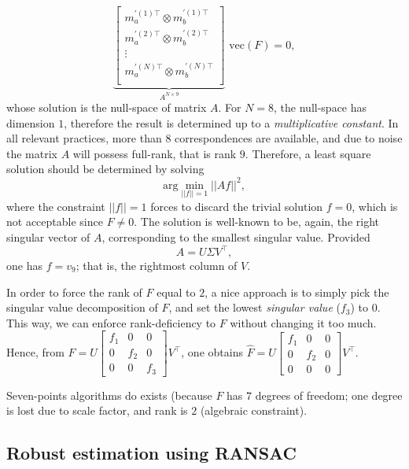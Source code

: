 \documentclass[10pt]{report}
\begin{document}
$$\underbrace{\begin{bmatrix} m^{\prime(1)\top}_a \otimes m^{\prime(1)\top}_b \\
m^{\prime(2)\top}_a \otimes m^{\prime(2)\top}_b \\
\vdots \\
m^{\prime(N)\top}_a \otimes m^{\prime(N)\top}_b \\ \end{bmatrix}}_{A^{N \times 9}}\mbox{ vec}(F) = 0,$$ whose solution is the null\--space of matrix \(A\). For \(N = 8\), the null\--space has dimension \(1\), therefore the result is determined up to a \emph{multiplicative constant}. In all relevant practices, more than \(8\) correspondences are available, and due to noise the matrix \(A\) will possess full\--rank, that is rank \(9\). Therefore, a least square solution should be determined by solving $$\mbox{arg}\min_{||f||=1} ||Af||^2,$$ where the constraint \(||f||=1\) forces to discard the trivial solution \(f=0\), which is not acceptable since \(F\neq 0\). The solution is well\--known to be, again, the right singular vector of \(A\), corresponding to the smallest singular value. Provided $$A = U\Sigma V^\top,$$ one has \(f = v_9\); that is, the rightmost column of \(V\).

In order to force the rank of \(F\) equal to \(2\), a nice approach is
to simply pick the singular value decomposition of \(F\), and set the
lowest \emph{singular value} (\(f_3\)) to \(0\). This way, we can enforce
rank-deficiency to \(F\) without changing it too much. Hence, from \(F=U\begin{bmatrix}f_1 & 0 & 0 \\ 0 & f_2 & 0 \\ 0 & 0 & f_3\end{bmatrix}V^\top\), one obtains \(\hat F=U\begin{bmatrix}f_1 & 0 & 0 \\ 0 & f_2 & 0 \\ 0 & 0 & 0\end{bmatrix}V^\top\).

Seven-points algorithms do exists (because \(F\) has \(7\) degrees of
freedom; one degree is lost due to scale factor, and rank is \(2\)
(algebraic constraint).

\subsection{Robust estimation using RANSAC}
\label{sec:orga9832ab}
\end{document}
